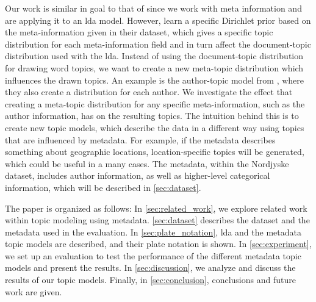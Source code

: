 Our work is similar in goal to that of \citet{MetaLDA2017} since we work with meta information and are applying it to an \gls{lda} model.
However, \citet{MetaLDA2017} learn a specific Dirichlet prior based on the meta-information given in their dataset, which gives a specific topic distribution for each meta-information field and in turn affect the document-topic distribution used with the \gls{lda}.
Instead of using the document-topic distribution for drawing word topics, we want to create a new meta-topic distribution which influences the drawn topics.
An example is the author-topic model from \citet{author_topic_2012}, where they also create a distribution for each author.
We investigate the effect that creating a meta-topic distribution for any specific meta-information, such as the author information, has on the resulting topics.
The intuition behind this is to create new topic models, which describe the data in a different way using topics that are influenced by metadata.
For example, if the metadata describes something about geographic locations, location-specific topics will be generated, which could be useful in a many cases.
The metadata, within the Nordjyske dataset, includes author information, as well as higher-level categorical information, which will be described in \autoref{sec:dataset}.

The paper is organized as follows:
In \autoref{sec:related_work}, we explore related work within topic modeling using metadata.
\autoref{sec:dataset} describes the dataset and the metadata used in the evaluation.
In \autoref{sec:plate_notation}, \gls{lda} and the metadata topic models are described, and their plate notation is shown.
In \autoref{sec:experiment}, we set up an evaluation to test the performance of the different metadata topic models and present the results.
In \autoref{sec:discussion}, we analyze and discuss the results of our topic models.
Finally, in \autoref{sec:conclusion}, conclusions and future work are given.
